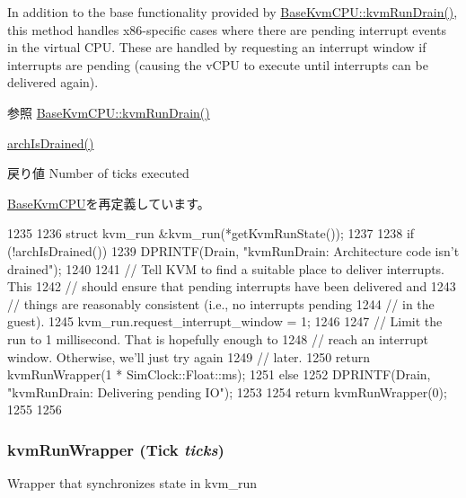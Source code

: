 In addition to the base functionality provided by \hyperlink{classBaseKvmCPU_a405afc17ad0dee3b816012ce909b2b6f}{BaseKvmCPU::kvmRunDrain()}, this method handles x86-\/specific cases where there are pending interrupt events in the virtual CPU. These are handled by requesting an interrupt window if interrupts are pending (causing the vCPU to execute until interrupts can be delivered again).

\begin{DoxySeeAlso}{参照}
\hyperlink{classBaseKvmCPU_a405afc17ad0dee3b816012ce909b2b6f}{BaseKvmCPU::kvmRunDrain()} 

\hyperlink{classX86KvmCPU_a1d97c7e0665d576bb463335078bb02ec}{archIsDrained()}
\end{DoxySeeAlso}
\begin{DoxyReturn}{戻り値}
Number of ticks executed 
\end{DoxyReturn}


\hyperlink{classBaseKvmCPU_a405afc17ad0dee3b816012ce909b2b6f}{BaseKvmCPU}を再定義しています。


\begin{DoxyCode}
1235 {
1236     struct kvm_run &kvm_run(*getKvmRunState());
1237 
1238     if (!archIsDrained()) {
1239         DPRINTF(Drain, "kvmRunDrain: Architecture code isn't drained\n");
1240 
1241         // Tell KVM to find a suitable place to deliver interrupts. This
1242         // should ensure that pending interrupts have been delivered and
1243         // things are reasonably consistent (i.e., no interrupts pending
1244         // in the guest).
1245         kvm_run.request_interrupt_window = 1;
1246 
1247         // Limit the run to 1 millisecond. That is hopefully enough to
1248         // reach an interrupt window. Otherwise, we'll just try again
1249         // later.
1250         return kvmRunWrapper(1 * SimClock::Float::ms);
1251     } else {
1252         DPRINTF(Drain, "kvmRunDrain: Delivering pending IO\n");
1253 
1254         return kvmRunWrapper(0);
1255     }
1256 }
\end{DoxyCode}
\hypertarget{classX86KvmCPU_afae1f96b6b1a482f400cd925b8709325}{
\subsubsection[{kvmRunWrapper}]{ kvmRunWrapper ({\bf Tick} {\em ticks})}}
\label{classX86KvmCPU_afae1f96b6b1a482f400cd925b8709325}
Wrapper that synchronizes state in kvm\_\-run 


